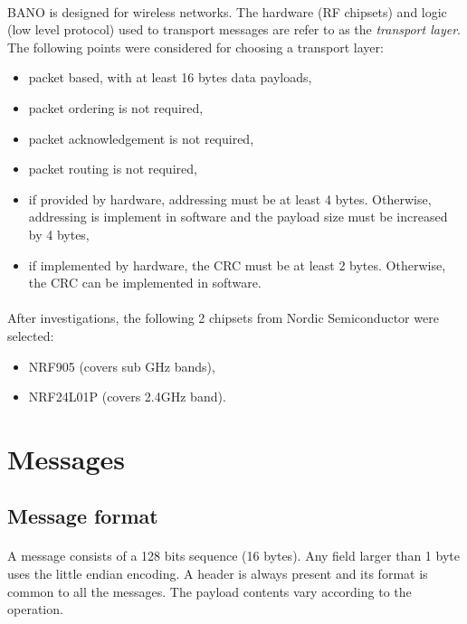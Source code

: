 \documentclass[a4paper, 11pt]{article}
\begin{document}
\paragraph{}
BANO is designed for wireless networks. The hardware (RF chipsets) and logic
(low level protocol) used to transport messages are refer to as the
\textit{transport layer}. The following points were considered for choosing
a transport layer:
\begin{itemize}
\item packet based, with at least 16 bytes data payloads,
\item packet ordering is not required,
\item packet acknowledgement is not required,
\item packet routing is not required,
\item if provided by hardware, addressing must be at least 4 bytes. Otherwise,
addressing is implement in software and the payload size must be increased by 4
bytes,
\item if implemented by hardware, the CRC must be at least 2 bytes. Otherwise,
the CRC can be implemented in software.
\end{itemize}

\paragraph{}
After investigations, the following 2 chipsets from Nordic Semiconductor were
selected:
\begin{itemize}
\item NRF905 (covers sub GHz bands),
\item NRF24L01P (covers 2.4GHz band).
\end{itemize}


\clearpage
\section{Messages}

\subsection{Message format}

\paragraph{}
A message consists of a 128 bits sequence (16 bytes). Any field larger than 1
byte uses the little endian encoding. A header is always present and its format
is common to all the messages. The payload contents vary according to the operation.
\end{document}
